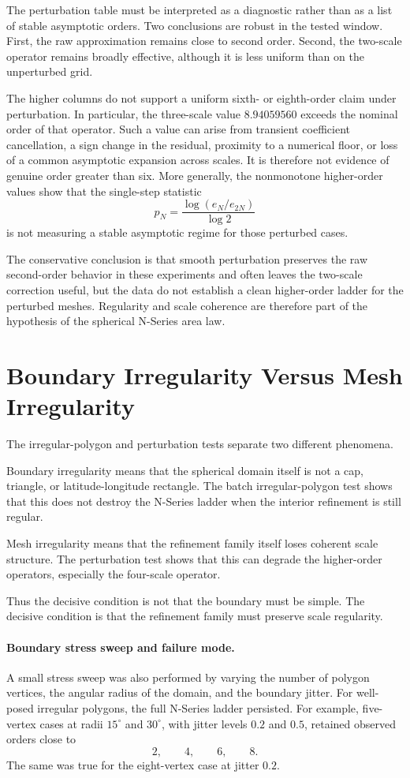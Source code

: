 \documentclass[11pt]{article}
\begin{document}
The perturbation table must be interpreted as a diagnostic rather than as a
list of stable asymptotic orders.  Two conclusions are robust in the tested
window.  First, the raw approximation remains close to second order.  Second,
the two-scale operator remains broadly effective, although it is less uniform
than on the unperturbed grid.

The higher columns do not support a uniform sixth- or eighth-order claim under
perturbation.  In particular, the three-scale value $8.94059560$ exceeds the
nominal order of that operator.  Such a value can arise from transient
coefficient cancellation, a sign change in the residual, proximity to a
numerical floor, or loss of a common asymptotic expansion across scales.  It
is therefore not evidence of genuine order greater than six.  More generally,
the nonmonotone higher-order values show that the single-step statistic
\[
  p_N=\frac{\log(e_N/e_{2N})}{\log 2}
\]
is not measuring a stable asymptotic regime for those perturbed cases.

The conservative conclusion is that smooth perturbation preserves the raw
second-order behavior in these experiments and often leaves the two-scale
correction useful, but the data do not establish a clean higher-order ladder
for the perturbed meshes.  Regularity and scale coherence are therefore part
of the hypothesis of the spherical N-Series area law.

\section{Boundary Irregularity Versus Mesh Irregularity}

The irregular-polygon and perturbation tests separate two different
phenomena.

Boundary irregularity means that the spherical domain itself is not a cap,
triangle, or latitude-longitude rectangle.  The batch irregular-polygon test
shows that this does not destroy the N-Series ladder when the interior
refinement is still regular.

Mesh irregularity means that the refinement family itself loses coherent
scale structure.  The perturbation test shows that this can degrade the
higher-order operators, especially the four-scale operator.

Thus the decisive condition is not that the boundary must be simple.  The
decisive condition is that the refinement family must preserve scale
regularity.

\paragraph{Boundary stress sweep and failure mode.}
A small stress sweep was also performed by varying the number of polygon
vertices, the angular radius of the domain, and the boundary jitter.  For
well-posed irregular polygons, the full N-Series ladder persisted.  For
example, five-vertex cases at radii $15^\circ$ and $30^\circ$, with jitter
levels $0.2$ and $0.5$, retained observed orders close to
\[
  2,\qquad 4,\qquad 6,\qquad 8.
\]
The same was true for the eight-vertex case at jitter $0.2$.
\end{document}
